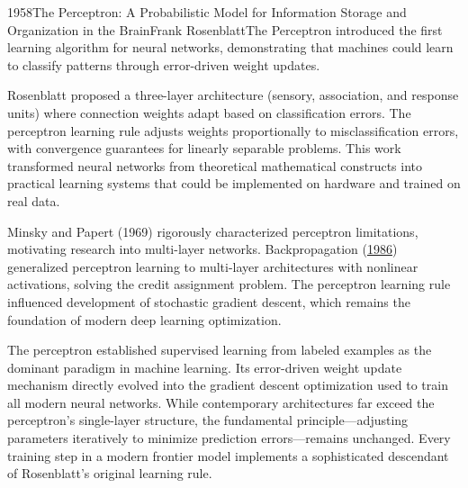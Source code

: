 
\begin{papersummary}{1958}{The Perceptron: A Probabilistic Model for Information Storage and Organization in the Brain}{Frank Rosenblatt}{The Perceptron introduced the first learning algorithm for neural networks, demonstrating that machines could learn to classify patterns through error-driven weight updates.}

Rosenblatt proposed a three-layer architecture (sensory, association, and response units) where connection weights adapt based on classification errors. The perceptron learning rule adjusts weights proportionally to misclassification errors, with convergence guarantees for linearly separable problems. This work transformed neural networks from theoretical mathematical constructs into practical learning systems that could be implemented on hardware and trained on real data.

Minsky and Papert (1969) rigorously characterized perceptron limitations, motivating research into multi-layer networks. Backpropagation (\hyperref[paper:rumelhart-hinton-williams-1986]{1986}) generalized perceptron learning to multi-layer architectures with nonlinear activations, solving the credit assignment problem. The perceptron learning rule influenced development of stochastic gradient descent, which remains the foundation of modern deep learning optimization.

The perceptron established supervised learning from labeled examples as the dominant paradigm in machine learning. Its error-driven weight update mechanism directly evolved into the gradient descent optimization used to train all modern neural networks. While contemporary architectures far exceed the perceptron's single-layer structure, the fundamental principle—adjusting parameters iteratively to minimize prediction errors—remains unchanged. Every training step in a modern frontier model implements a sophisticated descendant of Rosenblatt's original learning rule.

\end{papersummary}
